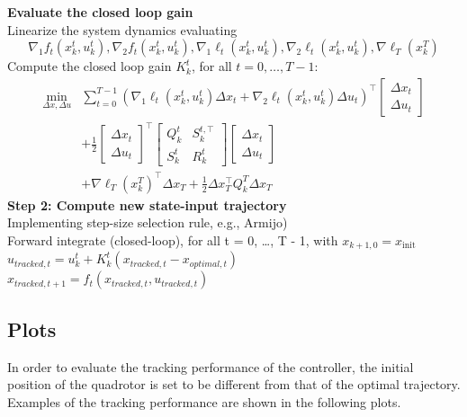 \textbf{Evaluate the closed loop gain}\vspace{8pt} \\
Linearize the system dynamics evaluating 
\[\nabla_1 f_t(x_k^t, u_k^t), \nabla_2 f_t(x_k^t, u_k^t), \nabla_1 \ell_t(x_k^t, u_k^t), \nabla_2 \ell_t(x_k^t, u_k^t), \nabla \ell_T(x_k^T)\] 
Compute the closed loop gain $K_k^t$, for all $t = 0, \ldots, T - 1$:
\begin{align*}
\min_{\Delta x, \Delta u} &\sum_{t=0}^{T-1} \left( \nabla_1 \ell_t(x_k^t, u_k^t) \Delta x_t + \nabla_2 \ell_t(x_k^t, u_k^t) \Delta u_t \right)^\top \begin{bmatrix} \Delta x_t \\ \Delta u_t \end{bmatrix} \\
&+ \frac{1}{2} \begin{bmatrix} \Delta x_t \\ \Delta u_t \end{bmatrix}^\top \begin{bmatrix} Q_k^t & S_k^{t,\top} \\ S_k^t & R_k^t \end{bmatrix} \begin{bmatrix} \Delta x_t \\ \Delta u_t \end{bmatrix} \\
&+ \nabla \ell_T(x_k^T)^\top \Delta x_T + \frac{1}{2} \Delta x_T^\top Q_k^T \Delta x_T
\end{align*}
\textbf{Step 2: Compute new state-input trajectory}\vspace{8pt} \\
Implementing step-size selection rule, e.g., Armijo) \\
Forward integrate (closed-loop), for all  t = 0, \ldots, T - 1,  with  $x_{k+1,0} = x_{\text{init}}$ \vspace{8pt}\\
$u_{tracked,t} = u_k^t + K_k^t (x_{tracked,t} - x_{optimal,t})$\\
$x_{tracked,t+1} = f_t(x_{tracked,t}, u_{tracked,t})$\\


\subsection{Plots}
In order to evaluate the tracking performance of the controller, the initial position of the quadrotor is set to be different from that of the optimal trajectory. Examples of the tracking performance are shown in the following plots.

